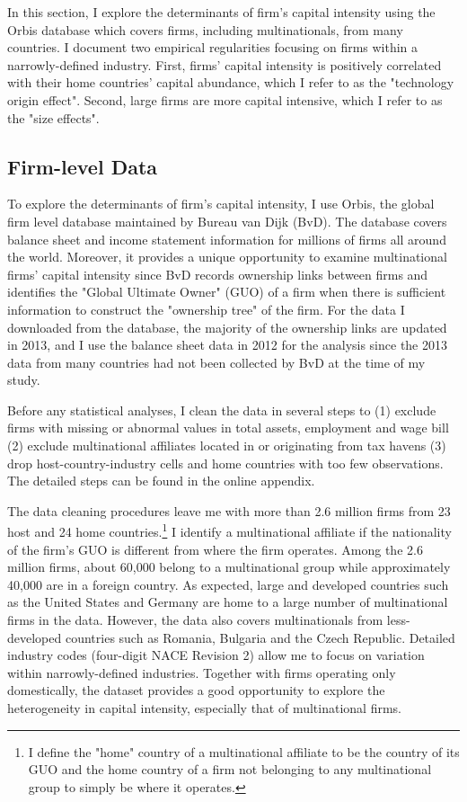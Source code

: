\documentclass[notitlepage,11pt]{article}%
\begin{document}
In this section, I explore the determinants of firm's capital intensity using
the Orbis database which covers firms, including multinationals, from many
countries. I document two empirical regularities focusing on firms within a
narrowly-defined industry. First, firms' capital intensity is positively
correlated with their home countries' capital abundance, which I refer to as
the "technology origin effect". Second, large firms are more capital
intensive, which I refer to as the "size effects".

\subsection{Firm-level Data}

To explore the determinants of firm's capital intensity, I use Orbis, the
global firm level database maintained by Bureau van Dijk (BvD). The database
covers balance sheet and income statement information for millions of firms
all around the world. Moreover, it provides a unique opportunity to examine
multinational firms' capital intensity since BvD records ownership links
between firms and identifies the "Global Ultimate Owner" (GUO) of a firm when
there is sufficient information to construct the "ownership tree" of the firm.
For the data I downloaded from the database, the majority of the ownership
links are updated in 2013, and I use the balance sheet data in 2012 for the
analysis since the 2013 data from many countries had not been collected by BvD
at the time of my study.

Before any statistical analyses, I clean the data in several steps to (1)
exclude firms with missing or abnormal values in total assets, employment and
wage bill (2) exclude multinational affiliates located in or originating from
tax havens (3) drop host-country-industry cells and home countries with too
few observations. The detailed steps can be found in the online appendix.

The data cleaning procedures leave me with more than 2.6 million firms from 23
host and 24 home countries.\footnote{I define the "home" country of a
multinational affiliate to be the country of its GUO and the home country of a
firm not belonging to any multinational group to simply be where it operates.}
I identify a multinational affiliate if the nationality of the firm's GUO is
different from where the firm operates. Among the 2.6 million firms, about
60,000 belong to a multinational group while approximately 40,000 are in a
foreign country. As expected, large and developed countries such as the United
States and Germany are home to a large number of multinational firms in the
data. However, the data also covers multinationals from less-developed
countries such as Romania, Bulgaria and the Czech Republic. Detailed industry
codes (four-digit NACE Revision 2) allow me to focus on variation within
narrowly-defined industries. Together with firms operating only domestically,
the dataset provides a good opportunity to explore the heterogeneity in
capital intensity, especially that of multinational firms.
\end{document}
